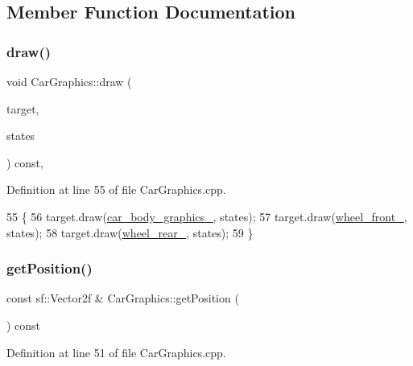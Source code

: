 \subsection{Member Function Documentation}
\mbox{\label{classCarGraphics_a7a9cf695c9bae5a533c21c6f5d78e635}} 
\subsubsection{\texorpdfstring{draw()}{draw()}}
{\footnotesize\ttfamily void Car\+Graphics\+::draw (\begin{DoxyParamCaption}\item[{sf\+::\+Render\+Target \&}]{target,  }\item[{sf\+::\+Render\+States}]{states }\end{DoxyParamCaption}) const\hspace{0.3cm}{\ttfamily [override]}, {\ttfamily [private]}}



Definition at line 55 of file Car\+Graphics.\+cpp.


\begin{DoxyCode}
55                                                                           \{
56     target.draw(\hyperlink{classCarGraphics_a4e1969ef5f4326f10b83b1488484f660}{car\_body\_graphics\_}, states);
57     target.draw(\hyperlink{classCarGraphics_a2e004e7f0288f6ed1352ba9116b4d112}{wheel\_front\_}, states);
58     target.draw(\hyperlink{classCarGraphics_a2a66d0c60b79f54a807a31afd76c4ad1}{wheel\_rear\_}, states);
59 \}
\end{DoxyCode}
\mbox{\label{classCarGraphics_a80e3b77608619843db5cbae4faee825b}} 
\subsubsection{\texorpdfstring{get\+Position()}{getPosition()}}
{\footnotesize\ttfamily const sf\+::\+Vector2f \& Car\+Graphics\+::get\+Position (\begin{DoxyParamCaption}{ }\end{DoxyParamCaption}) const}



Definition at line 51 of file Car\+Graphics.\+cpp.


